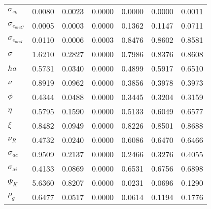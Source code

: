 \begin{center}
\begin{longtable}{lcccccc}
$ \sigma_{{e_b}}       $	 & 	          0.0080	 & 	          0.0023	 & 	          0.0000	 & 	          0.0000	 & 	          0.0000	 & 	          0.0011 \\ 
$ \sigma_{{e_{muC}}}   $	 & 	          0.0005	 & 	          0.0003	 & 	          0.0000	 & 	          0.1362	 & 	          0.1147	 & 	          0.0711 \\ 
$ \sigma_{{e_{muI}}}   $	 & 	          0.0110	 & 	          0.0006	 & 	          0.0003	 & 	          0.8476	 & 	          0.8602	 & 	          0.8581 \\ 
$ {\sigma}             $	 & 	          1.6210	 & 	          0.2827	 & 	          0.0000	 & 	          0.7986	 & 	          0.8376	 & 	          0.8608 \\ 
$ {ha}                 $	 & 	          0.5731	 & 	          0.0340	 & 	          0.0000	 & 	          0.4899	 & 	          0.5917	 & 	          0.6510 \\ 
$ \nu                  $	 & 	          0.8919	 & 	          0.0962	 & 	          0.0000	 & 	          0.3856	 & 	          0.3978	 & 	          0.3973 \\ 
$ {\phi}               $	 & 	          0.4344	 & 	          0.0488	 & 	          0.0000	 & 	          0.3445	 & 	          0.3204	 & 	          0.3159 \\ 
$ {\eta}               $	 & 	          0.5795	 & 	          0.1590	 & 	          0.0000	 & 	          0.5133	 & 	          0.6049	 & 	          0.6577 \\ 
$ \xi                  $	 & 	          0.8482	 & 	          0.0949	 & 	          0.0000	 & 	          0.8226	 & 	          0.8501	 & 	          0.8688 \\ 
$ {\nu_R}              $	 & 	          0.4732	 & 	          0.0240	 & 	          0.0000	 & 	          0.6086	 & 	          0.6470	 & 	          0.6466 \\ 
$ {\sigma_{ac}}        $	 & 	          0.9509	 & 	          0.2137	 & 	          0.0000	 & 	          0.2466	 & 	          0.3276	 & 	          0.4055 \\ 
$ {\sigma_{ai}}        $	 & 	          0.4133	 & 	          0.0869	 & 	          0.0000	 & 	          0.6531	 & 	          0.6756	 & 	          0.6898 \\ 
$ {\Psi_{K}}           $	 & 	          5.6360	 & 	          0.8207	 & 	          0.0000	 & 	          0.0231	 & 	          0.0696	 & 	          0.1290 \\ 
$ {\rho_g}             $	 & 	          0.6477	 & 	          0.0517	 & 	          0.0000	 & 	          0.0614	 & 	          0.1194	 & 	          0.1776 \\ 

\end{longtable}
\end{center}
